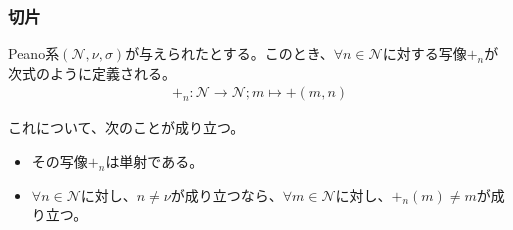 \documentclass[dvipdfmx]{jsarticle}
\begin{document}
\subsubsection{切片}%
\begin{dfn}
Peano系$\left( \mathcal{N,}\nu,\sigma \right)$が与えられたとする。このとき、$\forall n \in \mathcal{N}$に対する写像$+_{n}$が次式のように定義される。
\begin{align*}
+_{n}\mathcal{:N \rightarrow N;}m \mapsto + (m,n)
\end{align*}
\end{dfn}
\begin{thm}\label{1.2.4.15}これについて、次のことが成り立つ。
\begin{itemize}
\item
  その写像$+_{n}$は単射である。
\item
  $\forall n \in \mathcal{N}$に対し、$n \neq \nu$が成り立つなら、$\forall m \in \mathcal{N}$に対し、$+_{n}(m) \neq m$が成り立つ。
\end{itemize}
\end{thm}
\end{document}
